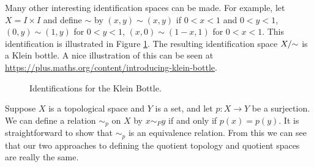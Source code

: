 \begin{comment}
	\item  All points in the interior of the square are identified only with themselves, but the boundaries points are all identified together as indicated at left in Figure \ref{F:Quotient_sphere}. So the boundary collapses to a point. Think of taking the square and pinching all of the sides together. What is left looks like a sphere, with the sides all identified with a single point on the sphere as shown at right in Figure \ref{F:Quotient_sphere}. %
\begin{figure}[h]
\begin{center}
\resizebox{!}{1.25in}{\texttt{[image: Quotient\_sphere\_1.png]}} \hspace{0.75in} \resizebox{!}{1.25in}{\texttt{[image: Quotient\_sphere\_2.png]}} 
\caption{A sphere as the identification space $X/\ssim$.} 
\label{F:Quotient_sphere}
\end{center}
\end{figure}

	\end{enumerate}
	
\ea

\end{comment}

Many other interesting identification spaces can be made. For example, let $X = I \times I$ and define $\sim$ by $(x, y) \sim (x,y)$ if $0 < x < 1$ and $0 < y < 1$, $(0, y) \sim (1, y)$ for $0 < y < 1$, $(x,0) \sim (1-x,1)$ for $0 < x < 1$. This identification is illustrated in Figure \ref{F:Klein_bottle}. The resulting identification space $X/\hspace{-1mm}\sim$ is a Klein bottle. A nice illustration of this can be seen at 
\url{https://plus.maths.org/content/introducing-klein-bottle}.
\begin{figure}[h]
\begin{center}
\caption{Identifications for the Klein Bottle.} 
\label{F:Klein_bottle}
\end{center}
\end{figure}

\label{sec_find_quotient_space}

Suppose $X$ is a topological space and $Y$ is a set, and let $p: X \to Y$ be a surjection. We can define a relation $\sim_p$ on $X$ by $x \sim_P y$ if and only if $p(x) = p(y)$. It is straightforward to show that $\sim_p$ is an equivalence relation. From this we can see that our two approaches to defining the quotient topology and quotient spaces are really the same. 

